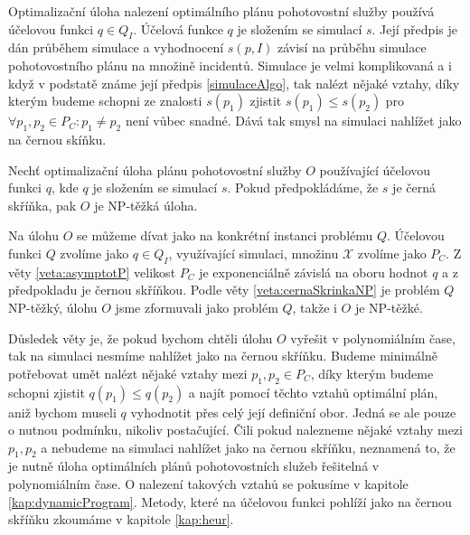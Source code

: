 Optimalizační úloha nalezení optimálního plánu pohotovostní služby používá účelovou funkci $q \in Q_I$.
Účelová funkce $q$ je složením se simulací $s$.
Její předpis je dán průběhem simulace a vyhodnocení $s(p, I)$ závisí na průběhu simulace pohotovostního plánu na množině incidentů.
Simulace je velmi komplikovaná a i když v podstatě známe její předpis \ref{simulaceAlgo},
tak nalézt nějaké vztahy, díky kterým budeme schopni ze znalosti $s(p_1)$ zjistit $s(p_1) \leq s(p_2)$ pro $\forall p_1, p_2 \in P_C \colon p_1 \neq p_2$ není vůbec snadné.
Dává tak smysl na simulaci nahlížet jako na černou skíňku.

\begin{veta}\label{veta:simulaceJakoCernaSkrinka}
  Nechť optimalizační úloha plánu pohotovostní služby $O$ používající účelovou funkci $q$, kde $q$ je složením se simulací $s$.
  Pokud předpokládáme, že $s$ je černá skříňka, pak $O$ je NP-těžká úloha.
\end{veta}

\begin{dukaz}
  Na úlohu $O$ se můžeme dívat jako na konkrétní instanci problému $Q$.
  Účelovou funkci $Q$ zvolíme jako $q \in Q_I$, využívající simulaci, množinu $\mathcal{X}$ zvolíme jako $P_C$.
  Z věty \ref{veta:asymptotP} velikost $P_C$ je exponenciálně závislá na oboru hodnot $q$ a z předpokladu je černou skříňkou. 
  Podle věty \ref{veta:cernaSkrinkaNP} je problém $Q$ NP-těžký, úlohu $O$ jsme zformuvali jako problém $Q$, takže i $O$ je NP-těžké.
\end{dukaz}

Důsledek věty je, že pokud bychom chtěli úlohu $O$ vyřešit v polynomiálním čase,
tak na simulaci nesmíme nahlížet jako na černou skříňku.
Budeme minimálně potřebovat umět nalézt nějaké vztahy mezi $p_1, p_2 \in P_C$, díky kterým budeme schopni zjistit $q(p_1) \leq q(p_2)$
a najít pomocí těchto vztahů optimální plán, aniž bychom museli $q$ vyhodnotit přes celý její definiční obor.
Jedná se ale pouze o nutnou podmínku, nikoliv postačující. Čili pokud nalezneme nějaké vztahy mezi $p_1, p_2$ a nebudeme na simulaci nahlížet jako na černou skříňku,
neznamená to, že je nutně úloha optimálních plánů pohotovostních služeb řešitelná v polynomiálním čase.
O nalezení takových vztahů se pokusíme v kapitole \ref{kap:dynamicProgram}. Metody, které na účelovou funkci pohlíží jako na černou skříňku zkoumáme v kapitole \ref{kap:heur}.


